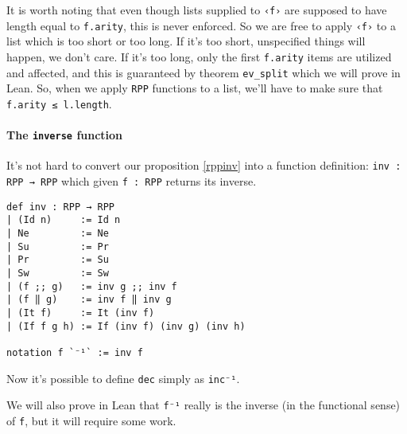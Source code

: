 \documentclass{book}
\theoremstyle{definition}
\theoremstyle{remark}
\theoremstyle{plain}
\begin{document}
It is worth noting that even though lists supplied to \lstinline{‹f›} are supposed to have length equal to \lstinline{f.arity},
this is never enforced.
So we are free to apply \lstinline{‹f›} to a list which is too short or too long.
If it's too short, unspecified things will happen, we don't care.
If it's too long, only the first \lstinline{f.arity} items are utilized and affected,
and this is guaranteed by theorem \lstinline{ev_split} which we will prove in Lean.
So, when we apply \lstinline{RPP} functions to a list, we'll have to make sure that
\lstinline{f.arity ≤ l.length}.

\paragraph{The \lstinline{inverse} function}
It's not hard to convert our proposition \ref{rppinv} into a function definition:
\lstinline{inv : RPP → RPP} which given \lstinline{f : RPP} returns its inverse.
\begin{lstlisting}
def inv : RPP → RPP
| (Id n)     := Id n
| Ne         := Ne
| Su         := Pr
| Pr         := Su
| Sw         := Sw
| (f ;; g)   := inv g ;; inv f
| (f ‖ g)    := inv f ‖ inv g
| (It f)     := It (inv f)
| (If f g h) := If (inv f) (inv g) (inv h)

notation f `⁻¹` := inv f
\end{lstlisting}
Now it's possible to define \lstinline{dec} simply as \lstinline{inc⁻¹}.

We will also prove in Lean that \lstinline{f⁻¹} really is the inverse (in the functional sense) of \lstinline{f},
but it will require some work.
\end{document}
